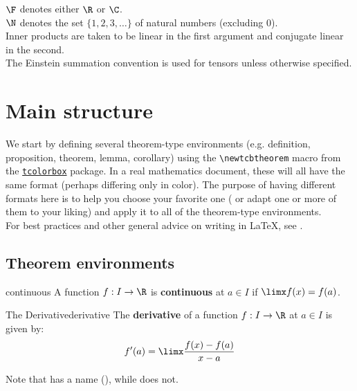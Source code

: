 \begin{convention}
$\F$ denotes either $\R$ or $\C$.\\
$\N$ denotes the set $\{1,2,3,\ldots\}$ of natural numbers (excluding $0$).\\
Inner products are taken to be linear in the first argument and conjugate linear in the second.\\
The Einstein summation convention is used for tensors unless otherwise specified.
\end{convention}

\newpage

\section{Main structure}

We start by defining several theorem-type environments 
(e.g. definition, proposition, theorem, lemma, corollary) using the 
\verb!\newtcbtheorem! macro from the \href{https://ctan.org/pkg/tcolorbox}{\texttt{tcolorbox}} package. 
In a real mathematics document, these will all have the same format (perhaps differing only in color). 
The purpose of having different formats here is to help you choose your favorite one (
or adapt one or more of them to your liking) and apply it to all of the theorem-type environments.\\

For best practices and other general advice on writing in \LaTeX, see \cite{evanchen,gleave}.

\subsection{Theorem environments}

\begin{definition}{}{continuous}
A function $f:I\to\R$ is \textbf{continuous} at $a\in I$ if $\limx f(x)=f(a)$.
\end{definition}

\begin{definition}{The Derivative}{derivative}
The \textbf{derivative} of a function $f:I\to\R$ at $a\in I$ is given by:
\begin{equation*}
    f'(a)=\limx\frac{f(x)-f(a)}{x-a}
\end{equation*}
\end{definition}

Note that  has a name (), while  does not.

